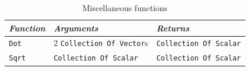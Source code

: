 \documentclass[11pt]{article}
\newcommand{\code}[1]{\texttt{#1}}
\begin{document}
\begin{table}
\begin{tabular}{l|l|l}
{\em Function} & {\em Arguments} & {\em Returns} \\
\hline
\code{Dot} & 2 \code{Collection Of Vector}s & \code{Collection Of Scalar} \\
\code{Sqrt} & \code{Collection Of Scalar} & \code{Collection Of Scalar} \\
\end{tabular}
\caption{Miscellaneous functions}
\label{tab:miscfunc}
\end{table}









\end{document}
